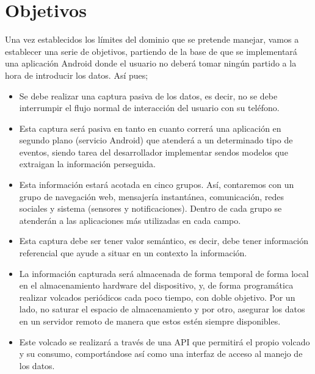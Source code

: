 \documentclass[12pt,a4paper,oneside]{book} %
\begin{document}
\chapter{Objetivos}
Una vez establecidos los límites del dominio que se pretende manejar, vamos a establecer una serie de objetivos, partiendo de la base de que se implementará una aplicación Android donde el usuario no deberá tomar ningún partido a la hora de introducir los datos. Así pues; 
\begin{itemize}
\item Se debe realizar una captura pasiva de los datos, es decir, no se debe interrumpir el flujo normal de interacción del usuario con su teléfono. 
\item Esta captura será pasiva en tanto en cuanto correrá una aplicación en segundo plano (servicio Android) que atenderá a un determinado tipo de eventos, siendo tarea del desarrollador implementar sendos modelos que extraigan la información perseguida. 
\item Esta información estará acotada en cinco grupos. Así, contaremos con un grupo de navegación web, mensajería instantánea, comunicación, redes sociales y sistema (sensores y notificaciones). Dentro de cada grupo se atenderán a las aplicaciones más utilizadas en cada campo. 
\item Esta captura debe ser tener valor semántico, es decir, debe tener información referencial que ayude a situar en un contexto la información. 
\item La información capturada será almacenada de forma temporal de forma local en el almacenamiento hardware del dispositivo, y, de forma programática realizar volcados periódicos cada poco tiempo, con doble objetivo. Por un lado, no saturar el espacio de almacenamiento y por otro, asegurar los datos en un servidor remoto de manera que estos estén siempre disponibles. 
\item Este volcado se realizará a través de una API que permitirá el propio volcado y su consumo, comportándose así como una interfaz de acceso al manejo de los datos. 
\end{itemize}
\newpage
\end{document}
